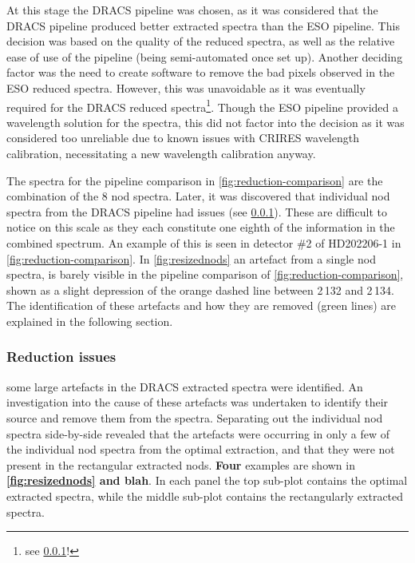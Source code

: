 At this stage the {DRACS} pipeline was chosen, as it was considered that the {DRACS} pipeline produced better extracted spectra than the {ESO} pipeline.
This decision was based on the quality of the reduced spectra, as well as the relative ease of use of the pipeline (being semi-automated once set up).
Another deciding factor was the need to create software to remove the bad pixels observed in the {ESO} reduced spectra.
However, this was unavoidable as it was eventually required for the {DRACS} reduced spectra\footnote{see \cref{subsubsec:reductionartefacts}!}.
Though the {ESO} pipeline provided a wavelength solution for the spectra, this did not factor into the decision as it was considered too unreliable due to known issues with {CRIRES} wavelength calibration, necessitating a new wavelength calibration anyway.

The spectra for the pipeline comparison in \cref{fig:reduction-comparison} are the combination of the 8 nod spectra.
Later, it was discovered that individual nod spectra from the {DRACS} pipeline had issues (see \cref{subsubsec:reductionartefacts}).
These are difficult to notice on this scale as they each constitute one eighth of the information in the combined spectrum.
An example of this is seen in detector \#2 of {HD202206-1} in \cref{fig:reduction-comparison}.
In \cref{fig:resizednods} an artefact from a single nod spectra, is barely visible in the pipeline comparison of \cref{fig:reduction-comparison}, shown as a slight depression of the orange dashed line between 2\,132 and 2\,134\nm{}.
The identification of these artefacts and how they are removed (green lines) are explained in the following section.

\subsubsection{Reduction issues}
\label{subsubsec:reductionartefacts}
\textbf{} some large artefacts in the {DRACS} extracted spectra were identified.
An investigation into the cause of these artefacts was undertaken to identify their source and remove them from the spectra.
Separating out the individual nod spectra side-by-side revealed that the artefacts were occurring in only a few of the individual nod spectra from the optimal extraction, and that they were not present in the rectangular extracted nods. \textbf{Four} examples are shown in \textbf{\cref{fig:resizednods} and blah}.
In each panel the top sub-plot contains the optimal extracted spectra, while the middle sub-plot contains the rectangularly extracted spectra.


